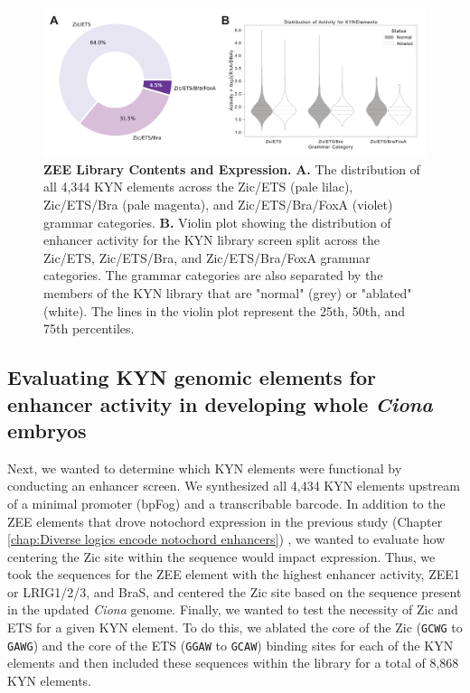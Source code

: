 \begin{figure}[h]
    \centering
    \includegraphics[scale=0.75]{3_figures-and-files/Fig2_Library-Information.png}
    \caption[ZEE Library Contents and Expression]{\textbf{ZEE Library Contents and Expression.} 
    \textbf{A.} The distribution of all 4,344 KYN elements across the Zic/ETS (pale lilac), Zic/ETS/Bra (pale magenta), and Zic/ETS/Bra/FoxA (violet) grammar categories. \textbf{B.} Violin plot showing the distribution of enhancer activity for the KYN library screen split across the Zic/ETS, Zic/ETS/Bra, and Zic/ETS/Bra/FoxA grammar categories. The grammar categories are also separated by the members of the KYN library that are "normal" (grey) or "ablated" (white). The lines in the violin plot represent the 25th, 50th, and 75th percentiles.}
    \label{fig:2 zee library}
\end{figure}

\subsection{Evaluating KYN genomic elements for enhancer activity in developing whole \textit{Ciona} embryos}

Next, we wanted to determine which KYN elements were functional by conducting an enhancer screen. We synthesized all 4,434 KYN elements upstream of a minimal promoter (bpFog) and a transcribable barcode. In addition to the ZEE elements that drove notochord expression in the previous study (Chapter \ref{chap:Diverse logics encode notochord enhancers}) \cite{song2022}, we wanted to evaluate how centering the Zic site within the sequence would impact expression. Thus, we took the sequences for the ZEE element with the highest enhancer activity, ZEE1 or LRIG1/2/3, and BraS, and centered the Zic site based on the sequence present in the updated \textit{Ciona} genome. Finally, we wanted to test the necessity of Zic and ETS for a given KYN element. To do this, we ablated the core of the Zic (\verb|GCWG| to \verb|GAWG|) and the core of the ETS (\verb|GGAW| to \verb|GCAW|) binding sites for each of the KYN elements and then included these sequences within the library for a total of 8,868 KYN elements. 

